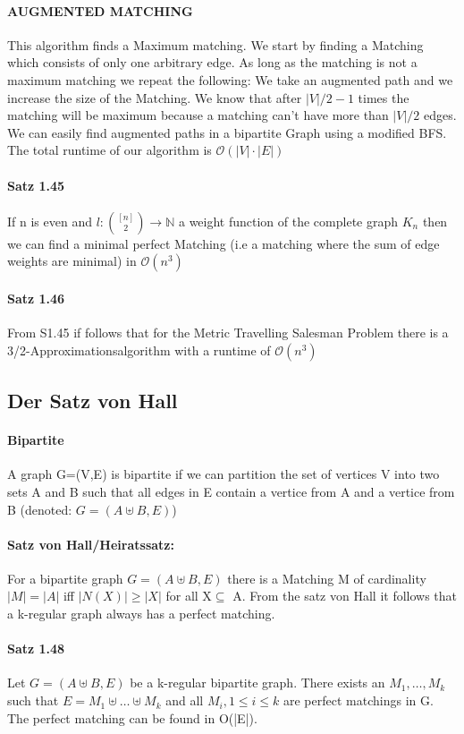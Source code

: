 \documentclass[8pt]{extreport}
\begin{document}
\paragraph{AUGMENTED MATCHING} This algorithm finds a Maximum matching. We start by finding a Matching which consists of only one arbitrary edge. As long as the matching is not a maximum matching we repeat the following: We take an augmented path and we increase the size of the Matching. We know that after $|V|/2-1$ times the matching will be maximum because a matching can't have more than $|V|/2$ edges. We can easily find augmented paths in a bipartite Graph using a modified BFS. The total runtime of our algorithm is $\mathcal{O}(|V|\cdot|E|)$
\paragraph{Satz 1.45} If n is even and $\mathit{l}: \binom{[n]}{2} \rightarrow \mathbb{N}$ a weight function of the complete graph $K_{n}$ then we can find a minimal perfect Matching (i.e a matching where the sum of edge weights are minimal) in $\mathcal{O}(n^3)$
\paragraph{Satz 1.46} From S1.45 if follows that for the Metric Travelling Salesman Problem there is a 3/2-Approximationsalgorithm with a runtime of $\mathcal{O}(n^3)$
\subsection{Der Satz von Hall}
\paragraph{Bipartite} A graph G=(V,E) is bipartite if we can partition the set of vertices V into two sets A and B such that all edges in E contain a vertice from A and a vertice from B (denoted: $G=(A \uplus B, E)$)
\paragraph{Satz von Hall/Heiratssatz:} For a bipartite graph $G=(A \uplus B, E)$ there is a Matching M of cardinality $|M| = |A|$ iff $|N(X)| \geq |X|$ for all X$\subseteq$ A. From the satz von Hall it follows that a k-regular graph always has a perfect matching.
\paragraph{Satz 1.48} Let $G=(A\uplus B,E)$ be a k-regular bipartite graph. There exists an $M_{1},\dots ,M_{k}$ such that $E = M_{1} \uplus \dots  \uplus M_{k}$ and all $M_{i}, 1\leq i\leq k$ are perfect matchings in G. The perfect matching can be found in O(|E|).
\end{document}

